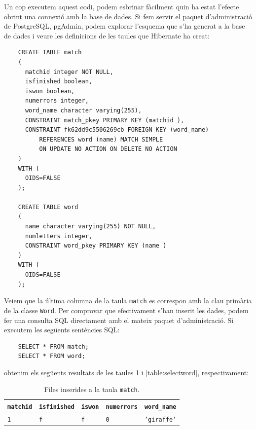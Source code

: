 Un cop executem aquest codi, podem esbrinar fàcilment quin ha estat l'efecte obrint una connexió amb la base de dades. Si fem servir el paquet d'administració de PostgreSQL, pgAdmin, podem explorar l'esquema que s'ha generat a la base de dades i veure les definicions de les taules que Hibernate ha creat:

\begin{verbatim}
    CREATE TABLE match
    (
      matchid integer NOT NULL,
      isfinished boolean,
      iswon boolean,
      numerrors integer,
      word_name character varying(255),
      CONSTRAINT match_pkey PRIMARY KEY (matchid ),
      CONSTRAINT fk62dd9c5506269cb FOREIGN KEY (word_name)
          REFERENCES word (name) MATCH SIMPLE
          ON UPDATE NO ACTION ON DELETE NO ACTION
    )
    WITH (
      OIDS=FALSE
    );
    
    CREATE TABLE word
    (
      name character varying(255) NOT NULL,
      numletters integer,
      CONSTRAINT word_pkey PRIMARY KEY (name )
    )
    WITH (
      OIDS=FALSE
    );
\end{verbatim}

Veiem que la última columna de la taula \texttt{match} es correspon amb la clau primària de la classe \texttt{Word}. Per comprovar que efectivament s'han inserit les dades, podem fer una consulta SQL directament amb el mateix paquet d'administració. Si executem les següents sentències SQL:

\begin{verbatim}
    SELECT * FROM match;
    SELECT * FROM word;
\end{verbatim}

obtenim els següents resultats de les taules \ref{table:selectmatch} i \ref{table:selectword}, respectivament:

\begin{table}[h]
	\begin{center}
		\begin{tabular}{|l|l|l|l|l|}
			\hline
			\texttt{matchid} & \texttt{isfinished} & \texttt{iswon} & \texttt{numerrors} & \texttt{word\_name} \\
			\hline \hline
			\texttt{1} & \texttt{f} & \texttt{f} & \texttt{0} & \texttt{'giraffe'} \\
			\hline
		\end{tabular}
	\end{center}
	\caption{Files inserides a la taula \texttt{match}.}
	\label{table:selectmatch}
\end{table}

